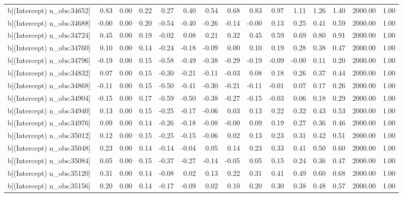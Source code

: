 \begin{table}[ht]
\begin{tabular}{rrrrrrrrrrrrrrr}
  b[(Intercept) n\_obs:34652] & 0.83 & 0.00 & 0.22 & 0.27 & 0.40 & 0.54 & 0.68 & 0.83 & 0.97 & 1.11 & 1.26 & 1.40 & 2000.00 & 1.00 \\ 
  b[(Intercept) n\_obs:34688] & -0.00 & 0.00 & 0.20 & -0.54 & -0.40 & -0.26 & -0.14 & -0.00 & 0.13 & 0.25 & 0.41 & 0.59 & 2000.00 & 1.00 \\ 
  b[(Intercept) n\_obs:34724] & 0.45 & 0.00 & 0.19 & -0.02 & 0.08 & 0.21 & 0.32 & 0.45 & 0.59 & 0.69 & 0.80 & 0.91 & 2000.00 & 1.00 \\ 
  b[(Intercept) n\_obs:34760] & 0.10 & 0.00 & 0.14 & -0.24 & -0.18 & -0.09 & 0.00 & 0.10 & 0.19 & 0.28 & 0.38 & 0.47 & 2000.00 & 1.00 \\ 
  b[(Intercept) n\_obs:34796] & -0.19 & 0.00 & 0.15 & -0.58 & -0.49 & -0.38 & -0.29 & -0.19 & -0.09 & -0.00 & 0.11 & 0.20 & 2000.00 & 1.00 \\ 
  b[(Intercept) n\_obs:34832] & 0.07 & 0.00 & 0.15 & -0.30 & -0.21 & -0.11 & -0.03 & 0.08 & 0.18 & 0.26 & 0.37 & 0.44 & 2000.00 & 1.00 \\ 
  b[(Intercept) n\_obs:34868] & -0.11 & 0.00 & 0.15 & -0.50 & -0.41 & -0.30 & -0.21 & -0.11 & -0.01 & 0.07 & 0.17 & 0.26 & 2000.00 & 1.00 \\ 
  b[(Intercept) n\_obs:34904] & -0.15 & 0.00 & 0.17 & -0.59 & -0.50 & -0.38 & -0.27 & -0.15 & -0.03 & 0.06 & 0.18 & 0.29 & 2000.00 & 1.00 \\ 
  b[(Intercept) n\_obs:34940] & 0.13 & 0.00 & 0.15 & -0.25 & -0.17 & -0.06 & 0.03 & 0.13 & 0.22 & 0.32 & 0.43 & 0.53 & 2000.00 & 1.00 \\ 
  b[(Intercept) n\_obs:34976] & 0.09 & 0.00 & 0.14 & -0.26 & -0.18 & -0.08 & -0.00 & 0.09 & 0.19 & 0.27 & 0.36 & 0.46 & 2000.00 & 1.00 \\ 
  b[(Intercept) n\_obs:35012] & 0.12 & 0.00 & 0.15 & -0.25 & -0.15 & -0.06 & 0.02 & 0.13 & 0.23 & 0.31 & 0.42 & 0.51 & 2000.00 & 1.00 \\ 
  b[(Intercept) n\_obs:35048] & 0.23 & 0.00 & 0.14 & -0.14 & -0.04 & 0.05 & 0.14 & 0.23 & 0.33 & 0.41 & 0.50 & 0.60 & 2000.00 & 1.00 \\ 
  b[(Intercept) n\_obs:35084] & 0.05 & 0.00 & 0.15 & -0.37 & -0.27 & -0.14 & -0.05 & 0.05 & 0.15 & 0.24 & 0.36 & 0.47 & 2000.00 & 1.00 \\ 
  b[(Intercept) n\_obs:35120] & 0.31 & 0.00 & 0.14 & -0.08 & 0.02 & 0.13 & 0.22 & 0.31 & 0.41 & 0.49 & 0.60 & 0.68 & 2000.00 & 1.00 \\ 
  b[(Intercept) n\_obs:35156] & 0.20 & 0.00 & 0.14 & -0.17 & -0.09 & 0.02 & 0.10 & 0.20 & 0.30 & 0.38 & 0.48 & 0.57 & 2000.00 & 1.00 \\ 

\end{tabular}
\end{table}
